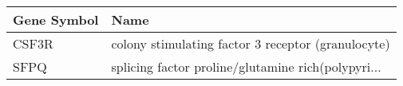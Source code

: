 \begin{tabular}{ll}
\toprule
Gene Symbol &                                               Name \\
\midrule
      CSF3R & colony stimulating factor 3 receptor (granulocyte) \\
       SFPQ & splicing factor proline/glutamine rich(polypyri... \\
\bottomrule
\end{tabular}
